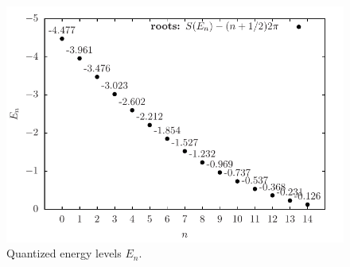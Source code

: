 \documentclass[11pt]{article}
\begin{document}
\begin{figure}[H]
  \centering
  \includegraphics[width=\linewidth]{quantizedEnergy-Morse}
  \caption{Quantized energy levels $E_n$.}
\label{fig:energy-Morse}
\end{figure}
\end{document}
